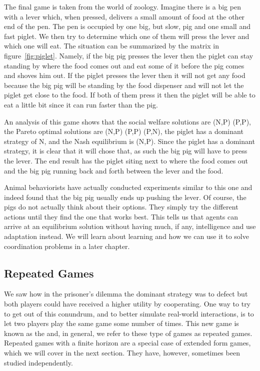 The final game is taken from the world of zoology.  Imagine there is a
big pen with a lever which, when pressed, delivers a small amount of
food at the other end of the pen. The pen is occupied by one big, but
slow, pig and one small and fast piglet. We then try to determine
which one of them will press the lever and which one will eat. The
situation can be summarized by the matrix in figure~\ref{fig:piglet}.
Namely, if the big pig presses the lever then the piglet can stay
standing by where the food comes out and eat some of it before the pig
comes and shoves him out. If the piglet presses the lever then it will
not get any food because the big pig will be standing by the food
dispenser and will not let the piglet get close to the food. If both
of them press it then the piglet will be able to eat a little bit
since it can run faster than the pig.

An analysis of this game shows that the social welfare solutions are
(N,P) (P,P), the Pareto optimal solutions are (N,P) (P,P) (P,N), the
piglet has a dominant strategy of N, and the Nash equilibrium is
(N,P). Since the piglet has a dominant strategy, it is clear that it
will chose that, as such the big pig will have to press the lever. The
end result has the piglet siting next to where the food comes out and
the big pig running back and forth between the lever and the food.

Animal behaviorists have actually conducted experiments similar to
this one and indeed found that the big pig usually ends up pushing the
lever.  Of course, the pigs do not actually think about their options.
They simply try the different actions until they find the one that
works best. This tells us that agents can arrive at an equilibrium
solution without having much, if any, intelligence and use adaptation
instead.  We will learn about learning and how we can use it to solve
coordination problems in a later chapter.


\subsection{Repeated Games}
\label{sec:repeated-games}

We saw how in the prisoner's dilemma the dominant strategy was to
defect but both players could have received a higher utility by
cooperating. One way to try to get out of this conundrum, and to
better simulate real-world interactions, is to let two players play
the same game some number of times. This new game is known as the
 and, in general, we refer to these
type of games as repeated games. Repeated games with a finite horizon
are a special case of extended form games, which we will cover in the
next section.  They have, however, sometimes been studied
independently.

